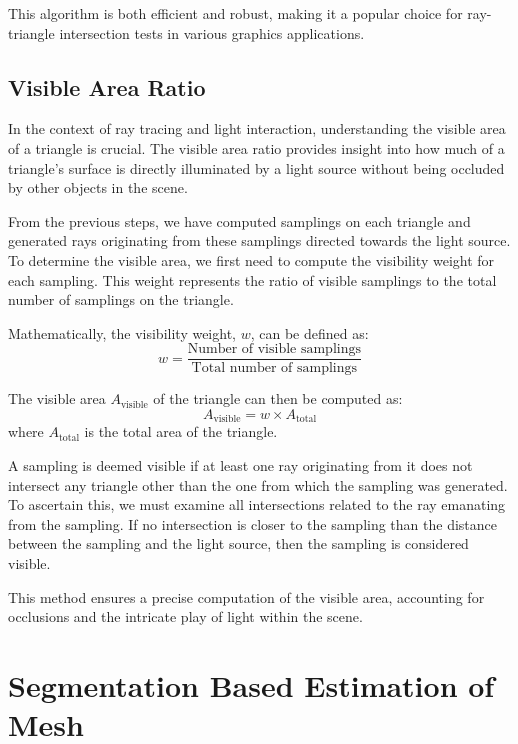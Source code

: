 \documentclass[11pt, a4paper,oneside,chapterprefix=false]{scrbook}
\begin{document}
This algorithm is both efficient and robust, making it a popular choice for ray-triangle intersection tests in various graphics applications.

\subsection{Visible Area Ratio}

In the context of ray tracing and light interaction, understanding the visible area of a triangle is crucial. The visible area ratio provides insight into how much of a triangle's surface is directly illuminated by a light source without being occluded by other objects in the scene.

From the previous steps, we have computed samplings on each triangle and generated rays originating from these samplings directed towards the light source. To determine the visible area, we first need to compute the visibility weight for each sampling. This weight represents the ratio of visible samplings to the total number of samplings on the triangle.

Mathematically, the visibility weight, \( w \), can be defined as:
\begin{equation}
    w = \frac{\text{Number of visible samplings}}{\text{Total number of samplings}}
\end{equation}

The visible area \( A_{\text{visible}} \) of the triangle can then be computed as:
\begin{equation}
    A_{\text{visible}} = w \times A_{\text{total}}
\end{equation}
where \( A_{\text{total}} \) is the total area of the triangle.

A sampling is deemed visible if at least one ray originating from it does not intersect any triangle other than the one from which the sampling was generated. To ascertain this, we must examine all intersections related to the ray emanating from the sampling. If no intersection is closer to the sampling than the distance between the sampling and the light source, then the sampling is considered visible.

This method ensures a precise computation of the visible area, accounting for occlusions and the intricate play of light within the scene.
 
\section{Segmentation Based Estimation of Mesh} \label{sec:region growing mesh estimation}
\end{document}
